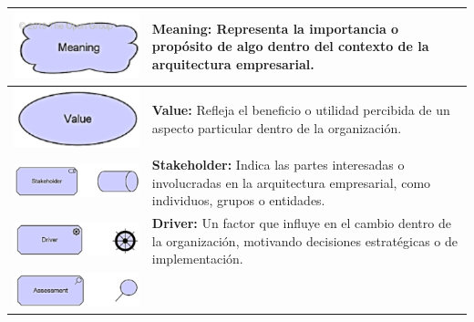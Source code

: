 \begin{longtable}{|c|p{8cm}|}
	\endlastfoot
	\includegraphics{anexos/ARCHI/strategy/meaning.png}     &
	\textbf{Meaning:} Representa la importancia o propósito de algo dentro del contexto de la arquitectura empresarial.                                  \\
	\hline
	\includegraphics{anexos/ARCHI/strategy/value.png}       &
	\textbf{Value:} Refleja el beneficio o utilidad percibida de un aspecto particular dentro de la organización.                                        \\
	\hline
	\includegraphics{anexos/ARCHI/strategy/stakeholder.png} &
	\textbf{Stakeholder:} Indica las partes interesadas o involucradas en la arquitectura empresarial, como individuos, grupos o entidades.              \\
	\hline
	\includegraphics{anexos/ARCHI/strategy/driver.png}      &
	\textbf{Driver:} Un factor que influye en el cambio dentro de la organización, motivando decisiones estratégicas o de implementación.                \\
	\hline
	\includegraphics{anexos/ARCHI/strategy/assessment.png}  &

\end{longtable}

